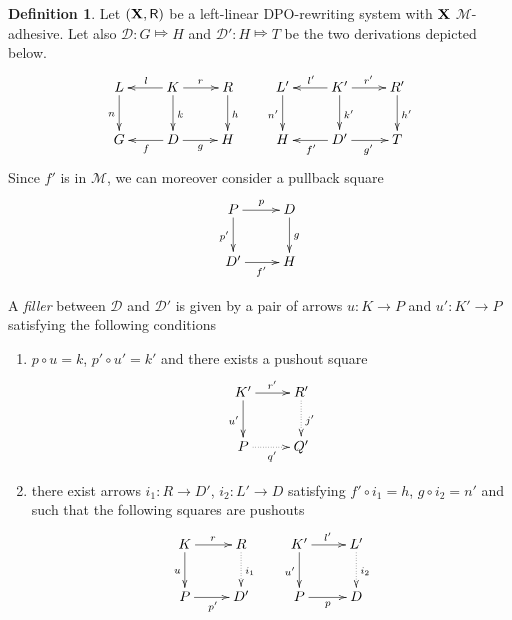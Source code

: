\documentclass[a4paper]{article}
\def\R{\mathsf{R}}
\def\X{\textbf {\textup{X}}}
\renewcommand{\P}{\textbf {\textup{P}}}
\newcommand{\dder}[1]{\mathscr{#1}}
\theoremstyle{definition}
\newtheorem{definition}[theorem]{Definition}
\begin{document}
\begin{definition}\label{def:filler}
Let $(\X, \R)$ be a left-linear DPO-rewriting system with $\X$ $\mathcal{M}$-adhesive. Let also $\dder{D}\colon G\Mapsto H$ and $\dder{D}'\colon H\Mapsto T$ be the two derivations depicted below.
\[\xymatrix{L \ar[d]_{n}& K \ar[d]^{k}\ar[l]_{l} \ar[r]^{r} & R \ar[d]^{h} & L' \ar[d]_{n'}& K' \ar[d]^{k'}\ar[l]_{l'} \ar[r]^{r'} & R' \ar[d]^{h'}\\G & \ar[l]^{f} D \ar[r]_{g}& H & H & \ar[l]^{f'} D' \ar[r]_{g'}& T}\]
Since $f'$ is in $\mathcal{M}$, we can moreover consider a pullback square
\[\xymatrix{P \ar[r]^{p} \ar[d]_{p'}& D\ar[d]^{g} \\ D' \ar[r]_{f'} & H}\]

A \emph{filler} between $\dder{D}$ and $\dder{D}'$ is  given by a pair of arrows $u\colon K\to P$ and $u'\colon K'\to P$ satisfying the following conditions
\begin{enumerate}
	\item $p\circ u = k$, $p'\circ u' = k'$ and there exists a pushout square
\[\xymatrix{K' \ar[r]^{r'} \ar[d]_{u'}& R'\ar@{.>}[d]^{j'} \\ P \ar@{.>}[r]_{q'} & Q'}\]
	\item  there exist arrows $i_1\colon R\to D'$, $i_2\colon L'\to D$ satisfying $f'\circ i_1=h$, $g\circ i_2=n'$ and such that the following squares are pushouts
\[\xymatrix{K \ar[r]^{r} \ar[d]_{u}& R \ar@{.>}[d]^{i_1} &K' \ar[r]^{l'} \ar[d]_{u'}& L'\ar@{.>}[d]^{i_2} \\P \ar[r]_{p'}& D' & P \ar[r]_{p} & D}\]
\end{enumerate}
\end{definition}
\end{document}
